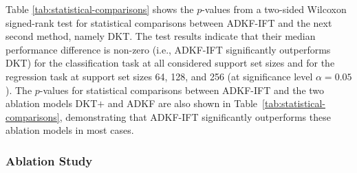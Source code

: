         Table \ref{tab:statistical-comparisons} shows the $p$-values from a two-sided Wilcoxon signed-rank test for statistical comparisons between ADKF-IFT and the next second method, namely DKT.
        The test results indicate that their median performance difference is non-zero
        (i.e., ADKF-IFT significantly outperforms DKT) for the classification task at all considered support
        set sizes and for the regression task at support set sizes 64, 128, and 256
        (at significance level $\alpha=0.05$).
        The $p$-values for statistical comparisons between ADKF-IFT and the two ablation models
        DKT$+$ and ADKF are also shown in Table~\ref{tab:statistical-comparisons},
        demonstrating that ADKF-IFT significantly outperforms these ablation models in most cases.
        
        \subsubsection{Ablation Study}
